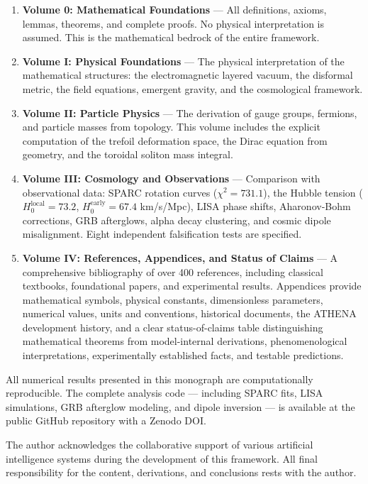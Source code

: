 \documentclass[12pt,oneside]{book}
\begin{document}
\begin{enumerate}
    \item \textbf{Volume 0: Mathematical Foundations} — All definitions, axioms, lemmas, theorems, and complete proofs. No physical interpretation is assumed. This is the mathematical bedrock of the entire framework.
    \item \textbf{Volume I: Physical Foundations} — The physical interpretation of the mathematical structures: the electromagnetic layered vacuum, the disformal metric, the field equations, emergent gravity, and the cosmological framework.
    \item \textbf{Volume II: Particle Physics} — The derivation of gauge groups, fermions, and particle masses from topology. This volume includes the explicit computation of the trefoil deformation space, the Dirac equation from geometry, and the toroidal soliton mass integral.
    \item \textbf{Volume III: Cosmology and Observations} — Comparison with observational data: SPARC rotation curves ($\chi^2 = 731.1$), the Hubble tension ($H_0^{\text{local}} = 73.2$, $H_0^{\text{early}} = 67.4$ km/s/Mpc), LISA phase shifts, Aharonov-Bohm corrections, GRB afterglows, alpha decay clustering, and cosmic dipole misalignment. Eight independent falsification tests are specified.
    \item \textbf{Volume IV: References, Appendices, and Status of Claims} — A comprehensive bibliography of over 400 references, including classical textbooks, foundational papers, and experimental results. Appendices provide mathematical symbols, physical constants, dimensionless parameters, numerical values, units and conventions, historical documents, the ATHENA development history, and a clear status-of-claims table distinguishing mathematical theorems from model-internal derivations, phenomenological interpretations, experimentally established facts, and testable predictions.
\end{enumerate}

All numerical results presented in this monograph are computationally reproducible. The complete analysis code — including SPARC fits, LISA simulations, GRB afterglow modeling, and dipole inversion — is available at the public GitHub repository with a Zenodo DOI.

The author acknowledges the collaborative support of various artificial intelligence systems during the development of this framework. All final responsibility for the content, derivations, and conclusions rests with the author.
\end{document}
